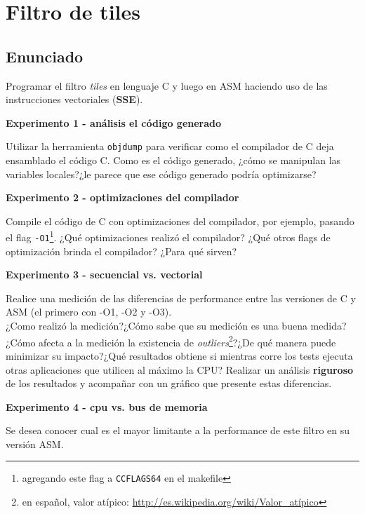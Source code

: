 \section{Filtro de tiles}
\subsection{Enunciado}

 Programar el filtro \textit{tiles} en lenguaje C y luego en ASM haciendo uso de las instrucciones vectoriales (\textbf{SSE}).

\vspace*{0.3cm} \noindent
\textbf{Experimento 1 - análisis el código generado}

Utilizar la herramienta \verb|objdump| para verificar como el compilador de C deja ensamblado el código C. Como es el código generado, ¿cómo se manipulan las variables 
locales?¿le parece que ese código generado podría optimizarse?

\vspace*{0.3cm} \noindent
\textbf{Experimento 2 - optimizaciones del compilador}

Compile el código de C con optimizaciones del compilador, por ejemplo, pasando el flag \verb|-O1|\footnote{agregando este flag a \texttt{CCFLAGS64} en el makefile}. 
¿Qué optimizaciones realizó el compilador?
¿Qué otros flags de optimización brinda el compilador?
¿Para qué sirven?


\vspace*{0.3cm} \noindent
\textbf{Experimento 3 - secuencial vs. vectorial}

	Realice una medición de las diferencias de performance entre las versiones
	de C y ASM (el primero con -O1, -O2 y -O3).\\
	¿Como realizó la medición?¿Cómo sabe que su medición es una buena medida?¿Cómo afecta a la medición la existencia de \emph{outliers}\footnote{en español, valor 
	atípico: \url{http://es.wikipedia.org/wiki/Valor_atípico}}?¿De qué manera puede minimizar su impacto?¿Qué resultados obtiene si mientras corre los tests ejecuta 
	otras aplicaciones que utilicen al máximo la CPU? 
	Realizar un análisis \textbf{riguroso} de los resultados y acompañar con un gráfico que presente estas diferencias.


\vspace*{0.3cm} \noindent
\textbf{Experimento 4 - cpu vs. bus de memoria}

	Se desea conocer cual es el mayor limitante a la performance de este filtro en su versión ASM.

